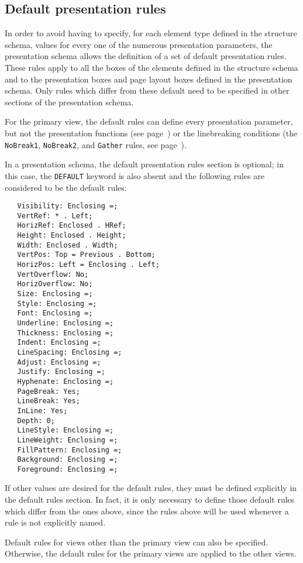 \subsection{Default presentation rules}
\label{reglesdefaut}

In order to avoid having to specify, for each element type defined in
the structure schema, values for every one of the numerous
presentation parameters, the presentation schema allows the definition
of a set of default presentation rules.  These rules apply to all the
boxes of the elements defined in the structure schema and to the
presentation boxes and page layout boxes defined in the presentation
schema.  Only rules which differ from these default need to be
specified in other sections of the presentation schema.

For the primary view, the default rules can define every presentation
parameter, but not the presentation functions (see
page~\pageref{fonctpres}) or the linebreaking conditions (the {\tt
NoBreak1}, {\tt NoBreak2}, and {\tt Gather} rules, see
page~\pageref{condcoupure}).

In a presentation schema, the default presentation rules section is
optional; in this case, the {\tt DEFAULT} keyword is also absent and
the following rules are considered to be the default rules:

\begin{verbatim}
   Visibility: Enclosing =;
   VertRef: * . Left;
   HorizRef: Enclosed . HRef;
   Height: Enclosed . Height;
   Width: Enclosed . Width;
   VertPos: Top = Previous . Bottom;
   HorizPos: Left = Enclosing . Left;
   VertOverflow: No;
   HorizOverflow: No;
   Size: Enclosing =;
   Style: Enclosing =;
   Font: Enclosing =;
   Underline: Enclosing =;
   Thickness: Enclosing =;
   Indent: Enclosing =;
   LineSpacing: Enclosing =;
   Adjust: Enclosing =;
   Justify: Enclosing =;
   Hyphenate: Enclosing =;
   PageBreak: Yes;
   LineBreak: Yes;
   InLine: Yes;
   Depth: 0;
   LineStyle: Enclosing =;
   LineWeight: Enclosing =;
   FillPattern: Enclosing =;
   Background: Enclosing =;
   Foreground: Enclosing =;
\end{verbatim}

If other values are desired for the default rules, they must be
defined explicitly in the default rules section.  In fact, it is only
necessary to define those default rules which differ from the ones
above, since the rules above will be used whenever a rule is not
explicitly named.

Default rules for views other than the primary  view can also be
specified.  Otherwise, the default rules for the primary views are
applied to the other views.

